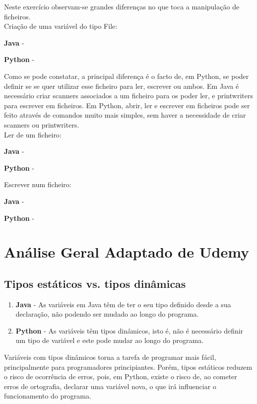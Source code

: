 \documentclass[a4paper]{report}
\begin{document}
Neste exercício observam-se grandes diferenças no que toca a manipulação de ficheiros.
\\[5pt]
Criação de uma variável do tipo File:
\begin{description}
    \item \textbf{Java} - 
    \item \textbf{Python} - 
\end{description}
Como se pode constatar, a principal diferença é o facto de, em Python, se poder definir se se quer utilizar esse ficheiro para ler, escrever ou ambos.
\clearpage
Em Java é necessário criar scanners associados a um ficheiro para os poder ler, e printwriters para escrever em ficheiros. Em Python, abrir, ler e escrever em ficheiros pode ser feito através de comandos muito mais simples, sem haver a necessidade de criar scanners ou printwriters.
\\[5pt]
Ler de um ficheiro:
\begin{description}
    \item \textbf{Java} - 
    \item \textbf{Python} - 
\end{description}
Escrever num ficheiro:
\begin{description}
    \item \textbf{Java} - 
    \item \textbf{Python} - 
\end{description}
\clearpage
\section{Análise Geral \footnotesize Adaptado de Udemy\cite{Udemy}}
\subsection{Tipos estáticos vs. tipos dinâmicas}
\begin{enumerate}
    \item \textbf{Java} - As variáveis em Java têm de ter o seu tipo definido desde a sua declaração, não podendo ser mudado ao longo do programa.
    \item \textbf{Python} - As variáveis têm tipos dinâmicos, isto é, não é necessário definir um tipo de variável e este pode mudar ao longo do programa.
\end{enumerate}
Variáveis com tipos dinâmicos torna a tarefa de programar mais fácil, principalmente para programadores principiantes. Porém, tipos estáticos reduzem o risco de ocorrência de erros, pois, em Python, existe o risco de, ao cometer erros de ortografia, declarar uma variável nova, o que irá influenciar o funcionamento do programa.
\end{document}
